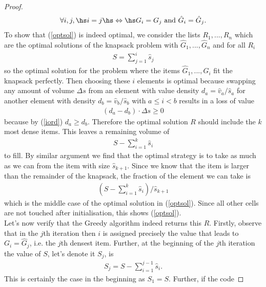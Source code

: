 \documentclass{article}
\begin{document}
\begin{proof}
\begin{align*}
        \forall i,j,\hs i=j \hs \Leftrightarrow \hs G_i = G_j \text{ and } \hat G_i = \hat G_j.
    \end{align*}
    To show that (\ref{optsol}) is indeed optimal, 
    we consider the lists $R_1, ..., R_n$ which are the optimal
    solutions of the knapsack problem with $\hat G_1, ..., \hat G_n$ and for all $R_i$
    \begin{align*}
        S = \sum_{j=1}^i \hat s_j
    \end{align*}
    so the optimal solution for the problem where the items $\hat G_1, ...,\hat G_i$
    fit the knapsack perfectly. Then choosing these $i$ elements
    is optimal because swapping any amount of volume $\Delta s$ from an
    element with value density $d_a = \hat v_a / \hat s_a$ for another element
    with density $d_b = \hat v_b / \hat s_b$ with $a\leq i < b$ results in a
    loss of value
    \begin{align*}
        (d_a - d_b) \cdot \Delta s \geq 0
    \end{align*}
    because by (\ref{iord}) $d_a\geq d_b$. Therefore the optimal solution $R$
    should include the $k$ most dense items. This leaves a remaining volume 
    of
    \begin{align*}
        S - \sum_{i=1}^k \hat s_i
    \end{align*}
    to fill. By similar argument we find that the optimal strategy is to take
    as much as we can from the item with size $\hat s_{k+1}$. Since we know
    that the item is larger than the remainder of the knapsack, the fraction
    of the element we can take is
    \begin{align*}
        \left(S - \sum_{i=1}^k \hat s_i\right)/\hat s_{k+1}
    \end{align*}
    which is the middle case of the optimal solution in (\ref{optsol}). 
    Since all other cells are not touched after initialisation, this shows (\ref{optsol}).\\
    Let's now verify that the Greedy algorithm indeed returns this $R$. 
    Firstly, observe that in the $j$th iteration then 
    $i$ is assigned precisely the value that leads to $G_i=\hat G_j$, 
    i.e. the $j$th densest item.
    Further, at the beginning of the $j$th iteration the value of $S$, let's denote it $S_j$,
    is
    \begin{align}
        \label{sj}
        S_j = S - \sum_{i=1}^{j-1} \hat s_i.
    \end{align}
    This is certainly the case in the beginning as $S_1=S$. Further, if the code

\end{proof}
\end{document}
